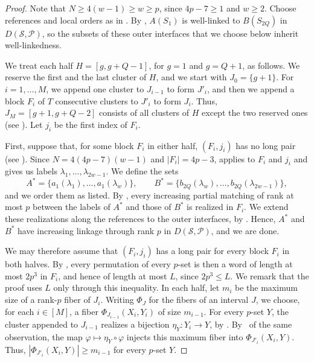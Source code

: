 \documentclass[fontsize=12pt,leading=14pt]{fullpaper}
\newcommand{\Pcal}{\mathcal{P}}
\newcommand{\Scal}{\mathcal{S}}
\begin{document}
\begin{proof}
  Note that $N\ge4(w-1)\ge w\ge p$, since $4p-7\ge1$ and $w\ge2$.
  Choose references and local orders as in .
  By , $A(S_1)$ is well-linked to $B(S_{2Q})$ in $D(\Scal,\Pcal)$, so the subsets of these outer interfaces that we choose below inherit well-linkedness.

  We treat each half $H=[g,g+Q-1]$, for $g=1$ and $g=Q+1$, as follows.
  We reserve the first and the last cluster of $H$, and we start with $J_0=\{g+1\}$.
  For $i=1,\dots,M$, we append one cluster to $J_{i-1}$ to form $J'_i$, and then we append a block $F_i$ of $T$ consecutive clusters to $J'_i$ to form $J_i$.
  Thus, $J_M=[g+1,g+Q-2]$ consists of all clusters of $H$ except the two reserved ones (see ).
  Let $j_i$ be the first index of $F_i$.

  First, suppose that, for some block $F_i$ in either half, $(F_i,j_i)$ has no long pair (see ).
  Since $N=4(4p-7)(w-1)$ and $|F_i|=4p-3$,  applies to $F_i$ and $j_i$ and gives us labels $\lambda_1,\dots,\lambda_{2w-1}$.
  We define the sets
  \[
    A^*=\{a_1(\lambda_1),\dots,a_1(\lambda_w)\},\qquad
    B^*=\{b_{2Q}(\lambda_w),\dots,b_{2Q}(\lambda_{2w-1})\},
  \]
  and we order them as listed.
  By , every increasing partial matching of rank at most $p$ between the labels of $A^*$ and those of $B^*$ is realized in $F_i$.
  We extend these realizations along the references to the outer interfaces, by .
  Hence, $A^*$ and $B^*$ have increasing linkage through rank $p$ in $D(\Scal,\Pcal)$, and we are done.

  We may therefore assume that $(F_i,j_i)$ has a long pair for every block $F_i$ in both halves.
  By , every permutation of every $p$-set is then a word of length at most $2p^3$ in $F_i$, and hence of length at most $L$, since $2p^3\le L$.
  We remark that the proof uses $L$ only through this inequality.
  In each half, let $m_i$ be the maximum size of a rank-$p$ fiber of $J_i$.
  Writing $\Phi_J$ for the fibers of an interval $J$, we choose, for each $i\in[M]$, a fiber $\Phi_{J_{i-1}}(X_i,Y_i)$ of size $m_{i-1}$.
  For every $p$-set $Y$, the cluster appended to $J_{i-1}$ realizes a bijection $\eta_Y\colon Y_i\to Y$, by .
  By~ of the same observation, the map $\varphi\mapsto\eta_Y\circ\varphi$ injects this maximum fiber into $\Phi_{J'_i}(X_i,Y)$.
  Thus, $|\Phi_{J'_i}(X_i,Y)|\ge m_{i-1}$ for every $p$-set $Y$.


\end{proof}
\end{document}

